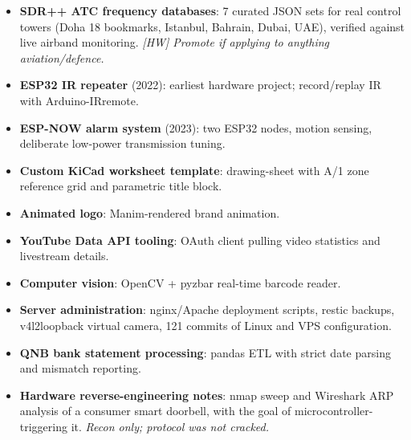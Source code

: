 \documentclass[10pt,a4paper]{article}
\begin{document}
\begin{itemize}
    \item \textbf{SDR++ ATC frequency databases}: 7 curated JSON sets for real control towers (Doha 18 bookmarks, Istanbul, Bahrain, Dubai, UAE), verified against live airband monitoring. \textit{[HW] Promote if applying to anything aviation/defence.}
    \item \textbf{ESP32 IR repeater} (2022): earliest hardware project; record/replay IR with Arduino-IRremote.
    \item \textbf{ESP-NOW alarm system} (2023): two ESP32 nodes, motion sensing, deliberate low-power transmission tuning.
    \item \textbf{Custom KiCad worksheet template}: drawing-sheet with A/1 zone reference grid and parametric title block.
    \item \textbf{Animated logo}: Manim-rendered brand animation.
    \item \textbf{YouTube Data API tooling}: OAuth client pulling video statistics and livestream details.
    \item \textbf{Computer vision}: OpenCV + pyzbar real-time barcode reader.
    \item \textbf{Server administration}: nginx/Apache deployment scripts, restic backups, v4l2loopback virtual camera, 121 commits of Linux and VPS configuration.
    \item \textbf{QNB bank statement processing}: pandas ETL with strict date parsing and mismatch reporting.
    \item \textbf{Hardware reverse-engineering notes}: nmap sweep and Wireshark ARP analysis of a consumer smart doorbell, with the goal of microcontroller-triggering it. \textit{Recon only; protocol was not cracked.}
\end{itemize}


%
%
\end{document}
